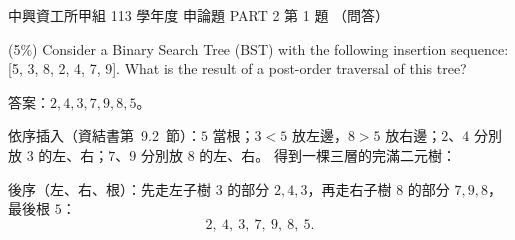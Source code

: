 \begin{pastexam}[label={px:nchu-113-dsa-25}]{中興資工所甲組 113 學年度 申論題 PART 2 第 1 題}
（問答）

(5\%) Consider a Binary Search Tree (BST) with the following insertion sequence: [5, 3, 8, 2, 4, 7, 9]. What
is the result of a post-order traversal of this tree?
\end{pastexam}

\begin{pastsoln}
答案：$2, 4, 3, 7, 9, 8, 5$。

依序插入（資結書第~9.2~節）：$5$ 當根；$3 < 5$ 放左邊，$8 > 5$ 放右邊；$2$、$4$ 分別放 $3$ 的左、右；$7$、$9$
分別放 $8$ 的左、右。 得到一棵三層的完滿二元樹：
\begin{center}
\end{center}
後序（左、右、根）：先走左子樹 $3$ 的部分 $2, 4, 3$，再走右子樹 $8$ 的部分 $7, 9, 8$，最後根 $5$：
\[
2,\ 4,\ 3,\ 7,\ 9,\ 8,\ 5.
\]
\end{pastsoln}
